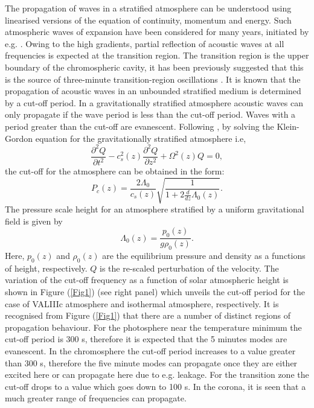 \documentclass[preprint,authoryear,12pt]{elsarticle}
\begin{document}
The propagation of waves in a stratified atmosphere can be understood using linearised versions of the 
equation of continuity, momentum and energy. Such atmospheric waves of expansion have been 
considered for many years, initiated by e.g. \citet{Lamb1932}. Owing to the high gradients, partial 
reflection of acoustic waves at all frequencies is expected at the transition region. The transition region 
is the upper boundary of the chromospheric cavity, it has been previously suggested that this is the source 
of three-minute transition-region oscillations \citet{Leibacher1971}. It is known that the propagation of 
acoustic waves in an unbounded stratified medium is determined by a cut-off period. In a gravitationally 
stratified atmosphere acoustic waves can only propagate if the wave period is less than the cut-off period. 
Waves with a period greater than the cut-off are evanescent. Following \citet{Taroyan2008}, by solving the 
Klein-Gordon equation for the gravitationally stratified atmosphere i.e, 
$$
\frac{\partial^2 Q}{\partial t^2} - c_s^2(z) \frac{\partial^2 Q}{\partial z^2} + \Omega^2(z)Q = 0,
$$
the cut-off for the atmosphere can be obtained in the form:
$$
P_{c}(z)=\frac{2\Lambda_0   }{ c_{s}(z)}   \sqrt{\frac{1}{1+2\frac{d}{dz}\Lambda_0(z)}}.
$$
The pressure scale height for an atmosphere stratified by a uniform gravitational field is given by
$$
\Lambda_0(z)=\frac{p_0(z)}{g\rho_0(z)}.
$$
Here, $p_0(z)$ and $\rho_0(z)$ are the equilibrium pressure and density as a functions of height, respectively. $Q$ is the 
re-scaled perturbation of the velocity. The variation of the cut-off frequency as a function of solar atmospheric height is shown in 
Figure (\ref{Fig1}) (see right panel) which unveils the cut-off period for the case of VALIIIc atmosphere and isothermal 
atmosphere, respectively. It is recognised from Figure (\ref{Fig1}) that there are a number of distinct 
regions of propagation behaviour. For the photosphere near the temperature minimum the cut-off period is 300 s, therefore 
it is expected that the 5 minutes modes are evanescent. In the chromosphere the cut-off period increases to a value greater than 300 s, 
therefore the five minute modes can propagate once they are either excited here or can propagate here due to e.g. leakage. For the transition zone the cut-off drops to a value which goes down to 100 s. In the corona, it is seen that a much greater range of frequencies can propagate.
\end{document}
